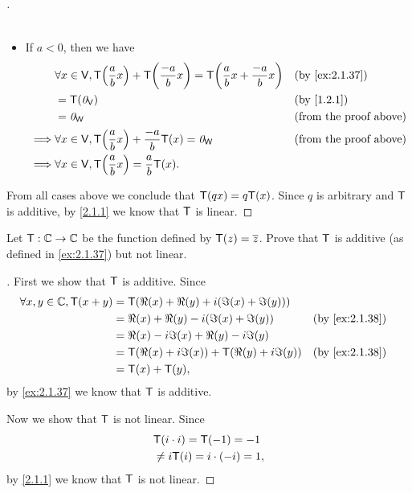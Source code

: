 \begin{proof}[]
\begin{itemize}
\begin{align*}
		      \end{align*}
		\item If \(a < 0\), then we have
		      \begin{align*}
			               & \forall x \in \V, \T\pa{\frac{a}{b} x} + \T\pa{\frac{-a}{b} x} = \T\pa{\frac{a}{b} x + \frac{-a}{b} x} &  & \by{ex:2.1.37}                \\
			               & = \T(\zv_{\V})                                                                                         &  & \by{1.2.1}                    \\
			               & = \zv_{\W}                                                                                             &  & \text{(from the proof above)} \\
			      \implies & \forall x \in \V, \T\pa{\frac{a}{b} x} + \frac{-a}{b} \T(x) = \zv_{\W}                                 &  & \text{(from the proof above)} \\
			      \implies & \forall x \in \V, \T\pa{\frac{a}{b} x} = \frac{a}{b} \T(x).
		      \end{align*}
	\end{itemize}
	From all cases above we conclude that \(\mathsf{T}(qx) = q \mathsf{T}(x)\).
	Since \(q\) is arbitrary and \(\mathsf{T}\) is additive, by \cref{2.1.1} we know that \(\mathsf{T}\) is linear.
\end{proof}

\begin{ex}\label{ex:2.1.38}
	Let \(\mathsf{T} : \mathbb{C} \to \mathbb{C}\) be the function defined by \(\mathsf{T}(z) = \overline{z}\).
	Prove that \(\mathsf{T}\) is additive (as defined in \cref{ex:2.1.37}) but not linear.
\end{ex}

\begin{proof}[]
	First we show that \(\mathsf{T}\) is additive.
	Since
	\begin{align*}
		\forall x, y \in \C, \T(x + y) & = \T(\Re(x) + \Re(y) + i (\Im(x) + \Im(y)))                         \\
		                               & = \Re(x) + \Re(y) - i (\Im(x) + \Im(y))         &  & \by{ex:2.1.38} \\
		                               & = \Re(x) - i \Im(x) + \Re(y) - i \Im(y)                             \\
		                               & = \T(\Re(x) + i \Im(x)) + \T(\Re(y) + i \Im(y)) &  & \by{ex:2.1.38} \\
		                               & = \T(x) + \T(y),
	\end{align*}
	by \cref{ex:2.1.37} we know that \(\mathsf{T}\) is additive.

	Now we show that \(\mathsf{T}\) is not linear.
	Since
	\begin{align*}
		 & \mathsf{T}(i \cdot i) = \mathsf{T}(-1) = -1      \\
		 & \neq i \mathsf{T}(i) = i \cdot (-i) = 1,
	\end{align*}
	by \cref{2.1.1} we know that \(\mathsf{T}\) is not linear.
\end{proof}

